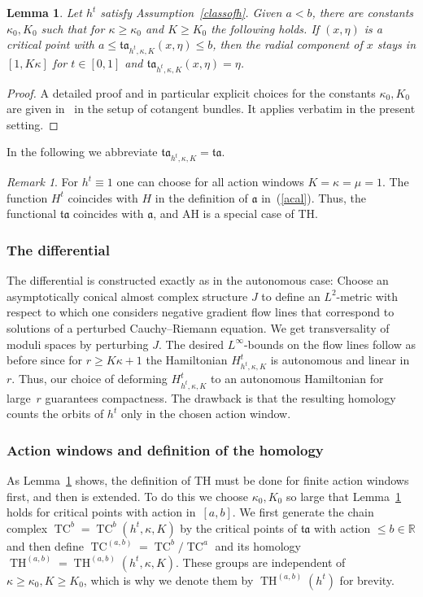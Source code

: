 \documentclass{amsart}
\newcommand{\acal}{\mathfrak{a}}
\newcommand{\tacal}{{\mathfrak{ta}}}
\newcommand{\RR}{\mathbb{R}}
\renewcommand{\TH}{\operatorname{TH}}
\newcommand{\TC}{\operatorname{TC}}
\newtheorem{lemma}[proposition]{Lemma}
\theoremstyle{definition}
\theoremstyle{remark}
\newtheorem{remark}[proposition]{Remark}
\numberwithin{equation}{section}
\begin{document}
\begin{lemma}\label{independence}
	Let $h^t$ satisfy Assumption~\ref{classofh}. Given $a<b$, there are constants $\kappa_0,K_0$ such that for $\kappa\geq\kappa_0$ and $K\geq K_0$ the following holds. If $(x,\eta)$ is a critical point with $a\leq\tacal_{h^t,\kappa,K}(x,\eta)\leq b$, then the radial component of $x$ stays in $[1,K\kappa]$ for $t\in[0,1]$ and $\tacal_{h^t,\kappa,K}(x,\eta)=\eta$. 
\end{lemma}
\begin{proof} 
	A detailed proof and in particular explicit choices for the constants $\kappa_0,K_0$ are given in~\cite[Proposition 4.3]{AF12} in the setup of cotangent bundles. It applies verbatim in the present setting.
\end{proof} 

In the following we abbreviate $\tacal_{h^t,\kappa,K}=\tacal$.

\begin{remark}
	For $h^t\equiv 1$ one can choose for all action windows $K=\kappa=\mu=1$. The function $H^t$ coincides with $H$ in the definition of $\acal$ in~(\ref{acal}). Thus, the functional $\tacal$ coincides with $\acal$, and AH is a special case of TH.
\end{remark}

\subsubsection*{The differential}
The differential is constructed exactly as in the autonomous case: Choose an asymptotically conical almost complex structure $J$ to define an $L^2$-metric with respect to which one considers negative gradient flow lines that correspond to solutions of a perturbed Cauchy--Riemann equation. We get transversality of moduli spaces by perturbing $J$. The desired $L^\infty$-bounds on the flow lines follow as before since for $r\geq K\kappa+1$ the Hamiltonian $H^t_{h^t,\kappa,K}$ is autonomous and linear in $r$. Thus, our choice of deforming $H^t_{h^t,\kappa,K}$ to an autonomous Hamiltonian for large~$r$ guarantees compactness. The drawback is that the resulting homology counts the orbits of $h^t$ only in the chosen action window. 

\subsubsection*{Action windows and definition of the homology}
As Lemma~\ref{independence} shows, the definition of TH must be done for finite action windows first, and then is extended. To do this we  choose $\kappa_0, K_0$ so large that Lemma~\ref{independence} holds for critical points with action in~$[a,b]$. We first generate the chain complex $\TC^b=\TC^b(h^t,\kappa,K)$ by the critical points of $\tacal$ with action $\leq b\in\RR$ and then define $\TC^{(a,b)}=\TC^b/\TC^a$ and its homology $\TH^{(a,b)}=\TH^{(a,b)}(h^t,\kappa,K)$. These groups are independent of $\kappa\geq\kappa_0,K\geq K_0$, which is why we denote them by $\TH^{(a,b)}(h^t)$ for brevity. 
\end{document}
